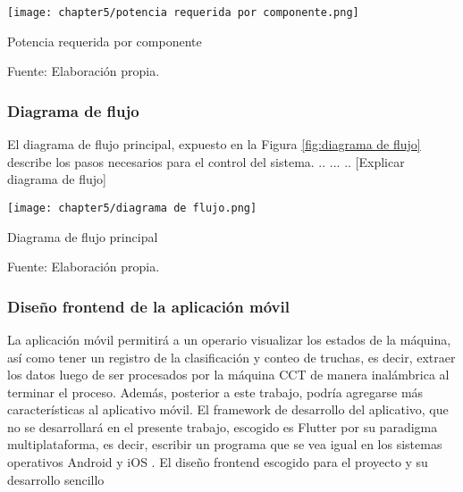      
\begin{myfigure}[H]
	\centering
	\texttt{[image: chapter5/potencia requerida por componente.png]}
	\caption{Potencia requerida por componente}
	\begin{myflushleftportland}
		Fuente: Elaboración propia.
	\end{myflushleftportland}
	\label{fig:potencia requerida por componente}
\end{myfigure}


\subsubsection{Diagrama de flujo}

El diagrama de flujo principal, expuesto en la Figura \ref{fig:diagrama de flujo} describe los pasos necesarios para el control del sistema. .. ... .. [Explicar diagrama de flujo]

\begin{myfigure}[H]
	\centering
	\texttt{[image: chapter5/diagrama de flujo.png]}
	\caption{Diagrama de flujo principal}
	\begin{myflushleftportland}
		Fuente: Elaboración propia.
	\end{myflushleftportland}
	\label{fig:diagrama de flujo}
\end{myfigure}


\subsubsection{Diseño frontend de la aplicación móvil}

La aplicación móvil permitirá a un operario visualizar los estados de la máquina, así como tener un registro de la clasificación y conteo de truchas, es decir, extraer los datos luego de ser procesados por la máquina CCT de manera inalámbrica al terminar el proceso. Además, posterior a este trabajo, podría agregarse más características al aplicativo móvil. El framework de desarrollo del aplicativo, que no se desarrollará en el presente trabajo, escogido es Flutter por su paradigma multiplataforma, es decir, escribir un programa que se vea igual en los sistemas operativos Android y iOS \cite{Simone2020}. El diseño frontend escogido para el proyecto y su desarrollo sencillo 

